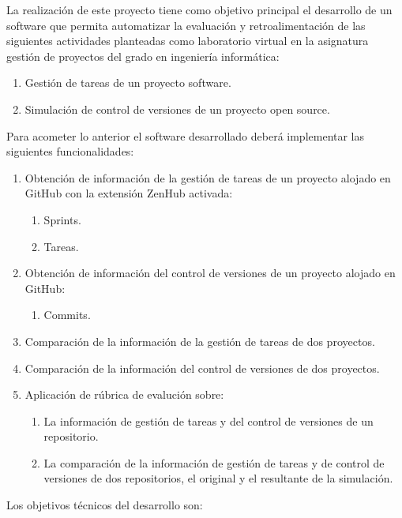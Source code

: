
La realización de este proyecto tiene como objetivo principal el desarrollo de un software que permita automatizar la evaluación y retroalimentación de las siguientes actividades planteadas como laboratorio virtual en la asignatura gestión de proyectos del grado en ingeniería informática:

\begin{enumerate}
	\item Gestión de tareas de un proyecto software. 
	\item Simulación de control de versiones de un proyecto open source.
\end{enumerate}

Para acometer lo anterior el software desarrollado deberá implementar las siguientes funcionalidades:

\begin{enumerate}
	\item Obtención de información de la gestión de tareas de un proyecto alojado en GitHub con la extensión ZenHub activada:
	\begin{enumerate}
		\item Sprints. 
		\item Tareas.	
	\end{enumerate}		
	\item Obtención de información del control de versiones de un proyecto alojado en GitHub:
	\begin{enumerate}
		\item Commits. 	
	\end{enumerate}
	\item Comparación de la información de la gestión de tareas de dos proyectos.
	\item Comparación de la información del control de versiones de dos proyectos.			
	\item Aplicación de rúbrica de evalución  sobre:
	\begin{enumerate}
		\item La información de gestión de tareas y del control de versiones de un repositorio. 
		\item La comparación de la información de gestión de tareas y de control de versiones de dos repositorios, el original y el resultante de la simulación.	
	\end{enumerate}			  
\end{enumerate}

Los objetivos  técnicos del desarrollo son:

